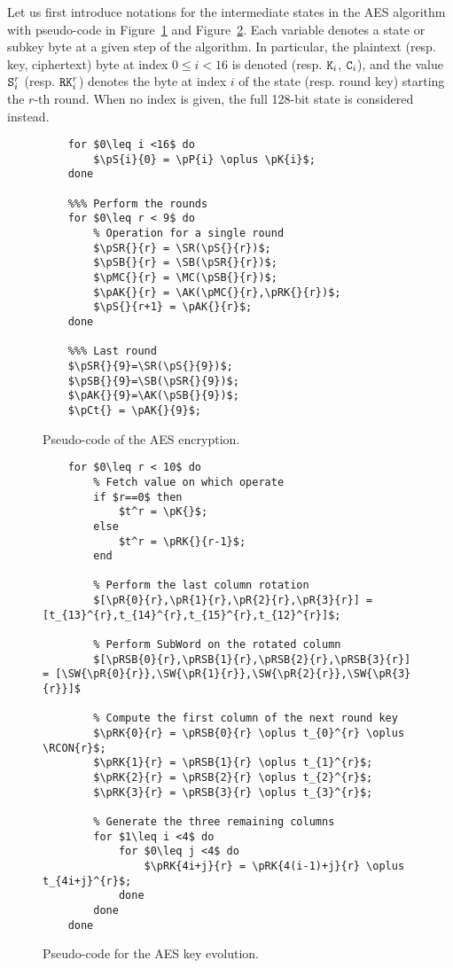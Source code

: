 \documentclass{scrartcl}
\begin{document}
Let us first introduce notations for the intermediate states in the AES algorithm with
pseudo-code in Figure~\ref{fig:code_round} and Figure~\ref{fig:code_key}.
Each variable denotes a state or subkey byte at a given step of the algorithm.
In particular, the plaintext (resp. key, ciphertext) byte at index $0\leq i<16$
is denoted  (resp. $\texttt{K}_{i}$, $\texttt{C}_{i}$), and the value $\texttt{S}_{i}^{r}$ (resp.
$\texttt{RK}_{i}^{r}$) denotes the byte at index $i$ of the state (resp. round key)
starting the $r$-th round.
When no index is given, the full 128-bit state is considered instead.

\begin{figure}
    \begin{lstlisting}[frame=single]
    %%% First key addition
    for $0\leq i <16$ do
        $\pS{i}{0} = \pP{i} \oplus \pK{i}$;
    done
    
    %%% Perform the rounds
    for $0\leq r < 9$ do 
        % Operation for a single round
        $\pSR{}{r} = \SR(\pS{}{r})$;
        $\pSB{}{r} = \SB(\pSR{}{r})$;
        $\pMC{}{r} = \MC(\pSB{}{r})$;
        $\pAK{}{r} = \AK(\pMC{}{r},\pRK{}{r})$;
        $\pS{}{r+1} = \pAK{}{r}$;
    done
    
    %%% Last round
    $\pSR{}{9}=\SR(\pS{}{9})$;
    $\pSB{}{9}=\SB(\pSR{}{9})$;
    $\pAK{}{9}=\AK(\pSB{}{9})$;
    $\pCt{} = \pAK{}{9}$;
    \end{lstlisting}
    \caption{Pseudo-code of the AES encryption.}
    \label{fig:code_round}
\end{figure}


\begin{figure}
    \begin{lstlisting}[frame=single]
    %%% Key evolution for each round key 
    for $0\leq r < 10$ do
        % Fetch value on which operate
        if $r==0$ then
            $t^r = \pK{}$; 
        else 
            $t^r = \pRK{}{r-1}$;
        end

        % Perform the last column rotation
        $[\pR{0}{r},\pR{1}{r},\pR{2}{r},\pR{3}{r}] = [t_{13}^{r},t_{14}^{r},t_{15}^{r},t_{12}^{r}]$; 

        % Perform SubWord on the rotated column
        $[\pRSB{0}{r},\pRSB{1}{r},\pRSB{2}{r},\pRSB{3}{r}] = [\SW{\pR{0}{r}},\SW{\pR{1}{r}},\SW{\pR{2}{r}},\SW{\pR{3}{r}}]$

        % Compute the first column of the next round key
        $\pRK{0}{r} = \pRSB{0}{r} \oplus t_{0}^{r} \oplus \RCON{r}$;
        $\pRK{1}{r} = \pRSB{1}{r} \oplus t_{1}^{r}$;
        $\pRK{2}{r} = \pRSB{2}{r} \oplus t_{2}^{r}$;
        $\pRK{3}{r} = \pRSB{3}{r} \oplus t_{3}^{r}$;

        % Generate the three remaining columns
        for $1\leq i <4$ do
            for $0\leq j <4$ do
                $\pRK{4i+j}{r} = \pRK{4(i-1)+j}{r} \oplus t_{4i+j}^{r}$;
            done
        done
    done
    \end{lstlisting}
    \caption{Pseudo-code for the AES key evolution.}
    \label{fig:code_key}
\end{figure}
\end{document}

